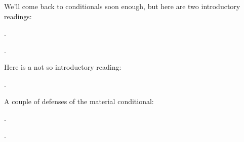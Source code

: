 {\setlength{\parindent}{0pt}\nonzeroparskip

We'll come back to conditionals soon enough, but here are two introductory
readings:

\begin{bibentrylist}
\item {}.
\item {}.
\end{bibentrylist}

Here is a not so introductory reading:

\begin{bibentrylist}
\item {}.
\end{bibentrylist}

A couple of defenses of the material conditional:

\begin{bibentrylist}
\item {}.
  \item {}.
\end{bibentrylist}

}




